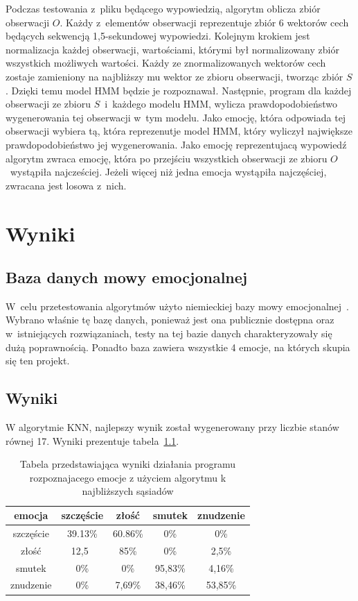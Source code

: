 \documentclass[declaration,shortabstract]{iithesis}
\begin{document}
Podczas testowania z~pliku będącego wypowiedzią, algorytm oblicza zbiór obserwacji $O$. Każdy z~elementów obserwacji reprezentuje zbiór 6 wektorów cech będących sekwencją 1,5-sekundowej wypowiedzi. Kolejnym krokiem jest normalizacja każdej obserwacji, wartościami, którymi był normalizowany zbiór wszystkich możliwych wartości. Każdy ze znormalizowanych wektorów cech zostaje zamieniony na najbliższy mu wektor ze zbioru obserwacji, tworząc zbiór $S$. Dzięki temu model HMM będzie je rozpoznawał. Następnie, program dla każdej obserwacji ze zbioru $S$~i~każdego modelu HMM, wylicza prawdopodobieństwo wygenerowania tej obserwacji w~tym modelu. Jako emocję, która odpowiada tej obserwacji wybiera tą, która reprezenutje model HMM, który wyliczył największe prawdopodobieństwo jej wygenerowania. Jako emocję reprezentujacą wypowiedź algorytm zwraca emocję, która po przejściu wszystkich obserwacji ze zbioru $O$~wystąpiła najcześciej. Jeżeli więcej niż jedna emocja wystąpiła najczęściej, zwracana jest losowa z~nich.

\chapter{Wyniki}
\section{Baza danych mowy emocjonalnej}
W~celu przetestowania algorytmów użyto niemieckiej bazy mowy emocjonalnej~\cite{BDemo}. Wybrano właśnie tę bazę danych, ponieważ jest ona publicznie dostępna oraz w~istniejących rozwiązaniach, testy na tej bazie danych charakteryzowały się dużą poprawnością. Ponadto baza zawiera wszystkie 4 emocje, na których skupia się ten projekt.

\section{Wyniki}
W algorytmie KNN, najlepszy wynik został wygenerowany przy liczbie stanów równej 17. Wyniki prezentuje tabela~\ref{KNN_result}.

\begin{table}[p]
\caption{Tabela przedstawiająca wyniki działania programu rozpoznajacego emocje z użyciem algorytmu k najbliższych sąsiadów}
\begin{center}
  \begin{tabular}{|c|c|c|c|c|}
    \hline
    emocja & szczęście & złość & smutek & znudzenie \\ \hline
    szczęście & 39.13\% & 60.86\% & 0\% & 0\% \\ \hline
	złość & 12,5\ & 85\% & 0\% & 2,5\% \\ \hline
	smutek & 0\% & 0\% & 95,83\% & 4,16\% \\ \hline
	znudzenie & 0\% & 7,69\% & 38,46\% & 53,85\%\\ 
	\hline
  \end{tabular}
  \label{KNN_result}
\end{center}
\end{table}
\end{document}
